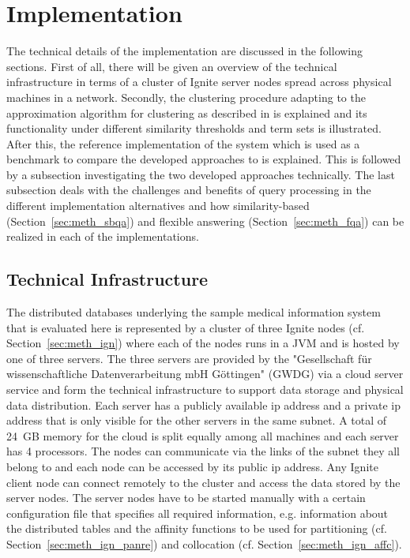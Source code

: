 
\section{Implementation}
\label{sec:impl}

The technical details of the implementation are discussed in the following sections. First of all, there will be given an overview of the technical 
infrastructure in terms of a cluster of Ignite server nodes spread across physical machines in a network. Secondly, the clustering procedure adapting to the 
approximation algorithm for clustering as described in \citet{Gonzales1985} is explained and its functionality under different similarity thresholds and term
sets is illustrated. After this, the reference implementation of the system which is used as a benchmark to compare the developed approaches to is explained.
This is followed by a subsection investigating the two developed approaches technically. The last subsection deals with the challenges and benefits of query
processing in the different implementation alternatives and how similarity-based (Section~\ref{sec:meth_sbqa}) and flexible answering 
(Section~\ref{sec:meth_fqa}) can be realized in each of the implementations.


\subsection{Technical Infrastructure}

The distributed  databases underlying the sample medical information system that is evaluated here is represented by a cluster of three
Ignite nodes (cf. Section~\ref{sec:meth_ign}) where each of the nodes runs in a JVM and is hosted by one of three servers. The three servers are provided by the
"Gesellschaft für wissenschaftliche Datenverarbeitung mbH Göttingen" (GWDG) via a cloud server service and form the technical infrastructure to support data
storage and physical data distribution. Each server has a publicly available ip address and a private ip address that is only visible for the other servers 
in the same subnet. A total of 24~GB memory for the cloud is split equally among all machines and each server has 4 processors. The nodes can communicate via 
the links of the subnet they all belong to and each node can be accessed by its public ip address. Any Ignite client node can connect remotely to the cluster
and access the data stored by the server nodes. The server nodes have to be started manually with a certain configuration file that specifies all required
information, e.g. information about the distributed tables and the affinity functions to be used for partitioning (cf. Section~\ref{sec:meth_ign_panre}) and
collocation (cf. Section~\ref{sec:meth_ign_affc}).

